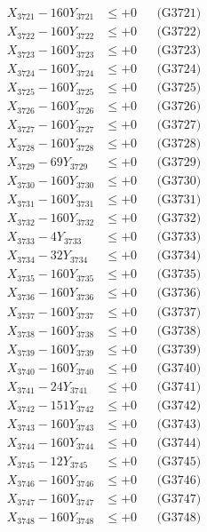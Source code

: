 \documentclass[a4paper,10pt]{article}
\begin{document}
{\begin{align}
\allowbreak
X_{3721} - 160Y_{3721} &\leq +0 && \text{(G3721)} \\
X_{3722} - 160Y_{3722} &\leq +0 && \text{(G3722)} \\
X_{3723} - 160Y_{3723} &\leq +0 && \text{(G3723)} \\
X_{3724} - 160Y_{3724} &\leq +0 && \text{(G3724)} \\
X_{3725} - 160Y_{3725} &\leq +0 && \text{(G3725)} \\
X_{3726} - 160Y_{3726} &\leq +0 && \text{(G3726)} \\
X_{3727} - 160Y_{3727} &\leq +0 && \text{(G3727)} \\
X_{3728} - 160Y_{3728} &\leq +0 && \text{(G3728)} \\
X_{3729} - 69Y_{3729} &\leq +0 && \text{(G3729)} \\
X_{3730} - 160Y_{3730} &\leq +0 && \text{(G3730)} \\
\allowbreak
X_{3731} - 160Y_{3731} &\leq +0 && \text{(G3731)} \\
X_{3732} - 160Y_{3732} &\leq +0 && \text{(G3732)} \\
X_{3733} - 4Y_{3733} &\leq +0 && \text{(G3733)} \\
X_{3734} - 32Y_{3734} &\leq +0 && \text{(G3734)} \\
X_{3735} - 160Y_{3735} &\leq +0 && \text{(G3735)} \\
X_{3736} - 160Y_{3736} &\leq +0 && \text{(G3736)} \\
X_{3737} - 160Y_{3737} &\leq +0 && \text{(G3737)} \\
X_{3738} - 160Y_{3738} &\leq +0 && \text{(G3738)} \\
X_{3739} - 160Y_{3739} &\leq +0 && \text{(G3739)} \\
X_{3740} - 160Y_{3740} &\leq +0 && \text{(G3740)} \\
\allowbreak
X_{3741} - 24Y_{3741} &\leq +0 && \text{(G3741)} \\
X_{3742} - 151Y_{3742} &\leq +0 && \text{(G3742)} \\
X_{3743} - 160Y_{3743} &\leq +0 && \text{(G3743)} \\
X_{3744} - 160Y_{3744} &\leq +0 && \text{(G3744)} \\
X_{3745} - 12Y_{3745} &\leq +0 && \text{(G3745)} \\
X_{3746} - 160Y_{3746} &\leq +0 && \text{(G3746)} \\
X_{3747} - 160Y_{3747} &\leq +0 && \text{(G3747)} \\
X_{3748} - 160Y_{3748} &\leq +0 && \text{(G3748)} \\

\end{align}}
\end{document}
